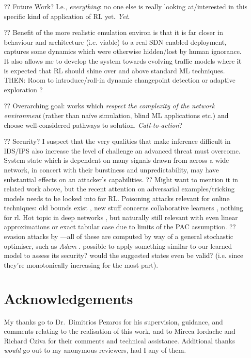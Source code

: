 \documentclass[conference, letterpaper, 10pt, times]{IEEEtran}
\begin{document}
?? Future Work? I.e., \emph{everything}: no one else is really looking at/interested in this specific kind of application of RL yet. \emph{Yet}.

?? Benefit of the more realistic emulation environ is that it is far closer in behaviour and architecture (i.e. viable) to a real SDN-enabled deployment, captures some dynamics which were otherwise hidden/lost by human ignorance. It also allows me to develop the system towards evolving traffic models where it is expected that RL should shine over and above standard ML techniques. THEN: Room to introduce/roll-in dynamic changepoint detection or adaptive exploration \cite{DBLP:conf/ki/Tokic10, DBLP:conf/ki/TokicP11, DBLP:conf/annpr/TokicP12}?

?? Overarching goal: works which \emph{respect the complexity of the network environment} (rather than na\"{i}ve simulation, blind ML applications etc.) and choose well-considered pathways to solution. \emph{Call-to-action}?

?? Security? I suspect that the very qualities that make inference difficult in IDS/IPS also increase the level of challenge an advanced threat must overcome.
System state which is dependent on many signals drawn from across a wide network, in concert with their burstiness and unpredictability, may have substantial effects on an attacker's capabilities.
?? Might want to mention it in related work above, but the recent attention on adversarial examples/tricking models needs to be looked into for RL. Poisoning attacks relevant for online techniques: old bounds exist \textcite{DBLP:journals/jmlr/KloftL10}, new stuff concerns collaborative learners \cite{DBLP:conf/acsac/ShenTS16}, nothing for rl. Hot topic in deep networks \cite{DBLP:conf/eurosp/PapernotMJFCS16, SpInMl}, but naturally still relevant with even linear approximations or exact tabular case due to limits of the PAC assumption.
?? evasion attacks by \textcite{DBLP:conf/sp/Carlini017}---all of these are computed by way of a general stochastic optimiser, such as \emph{Adam} \cite{DBLP:journals/corr/KingmaB14}. possible to apply something similar to our learned model to assess its security? would the suggested states even be valid? (i.e. since they're monotonically increasing for the most part).

\section*{Acknowledgements}
My thanks go to Dr.\ Dimitrios Pezaros for his supervision, guidance, and comments relating to the realisation of this work, and to Mircea Iordache and Richard Cziva for their comments and technical assistance.
Additional thanks \emph{would} go out to my anonymous reviewers, had I any of them.

\printbibliography
\end{document}
